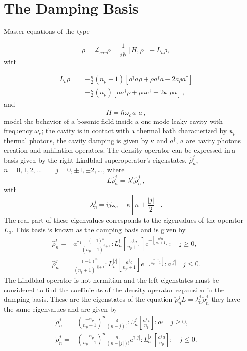 \documentclass[reprint, amsmath,amssymb, aps,pra]{revtex4-1}
\begin{document}
\appendix
\section{The Damping Basis}\label{App1}

Master equations of the type 

\begin{equation}
\dot{\rho} = \mathcal{L}_{cav} \rho = \frac{1}{i\hbar}[H,\rho]+L_a\rho, 
\end{equation} with

\begin{align}\label{EMField}
L_a \rho =& - \frac{\kappa}{2}(n_p+1)[a^\dagger a\rho + \rho a^\dagger a -2a\rho a^\dagger] \nonumber \\
 &- \frac{\kappa}{2}(n_p)[ aa^\dagger\rho + \rho  aa^\dagger -2a^\dagger\rho a]\, ,
\end{align}
and
\begin{equation}
  H=\hbar \omega_c \, a^\dagger a\, ,
\end{equation}
model the behavior of a bosonic field inside a one mode leaky cavity
with frequency $\omega_c$; the cavity is in contact with a thermal bath
characterized by $n_p$ thermal photons, the cavity damping is given by
$\kappa$ \cite{EnglertDB} and $a^\dagger$, $a$ are cavity photons
creation and anhilation operators. The density operator can be
expressed in a basis given by the right Lindblad superoperator's
eigenstates, ${\hat{\rho}_n^j}$,
$n=0,1,2,...\qquad j = 0,\pm 1, \pm 2,... $, where
\begin{equation}
L\hat{\rho}_n^j = \lambda_n^j\hat{\rho}_n^j\label{eq:eigen_damping}\, ,
\end{equation}
with
\begin{equation}
\lambda_n^j = ij\omega_c -\kappa[n + \frac{|j|}{2}]\, .
\end{equation}
The real part of these eigenvalues corresponds to the 
eigenvalues of the operator $L_a$. This basis is known as the damping
basis \cite{EnglertDB} and is given by
\begin{align}\label{DefDB}
\hat{\rho}_n^l=&a^{\dagger j}\frac{(-1)^n}{(n_p+1)^{j+1}}:L_n^l[\frac{a^\dagger a}{n_p+1}]e^{-[\frac{a^\dagger a}{n_p+1}]}:\quad j \geq 0, \\
\hat{\rho}_n^j=&\frac{(-1)^n}{(n_p+1)^{|j|+1}}:L_n^{|j|}[\frac{a^\dagger a}{n_p+1}]e^{-[\frac{a^\dagger a}{n_p+1}]}:a^{|j|}\quad j \leq 0.
\end{align}
The Lindblad operator is not hermitian and the left eigenstates must
be considered to find the coefficients of the density operator
expansion in the damping basis. These are the eigenstates of the
equation $\check{\rho}_n^jL = \lambda_n^j\check{\rho}_n^j$ they have
the same eigenvalues and are given by
\begin{align}\label{DefDBDual}
\check{\rho}_n^j=&(\frac{-n_p}{n_p+1})^n\frac{n!}{(n+j)!}:L_n^j[\frac{a^\dagger a}{n_p}]:a^{j}\quad j \geq 0, \\
\check{\rho}_n^j=&(\frac{-n_p}{n_p+1})^n\frac{n!}{(n+|j|)!}a^{\dagger|j|}:L_n^{|j|}[\frac{a^\dagger a}{n_p}]:\quad j \leq 0.
\end{align}
\end{document}
